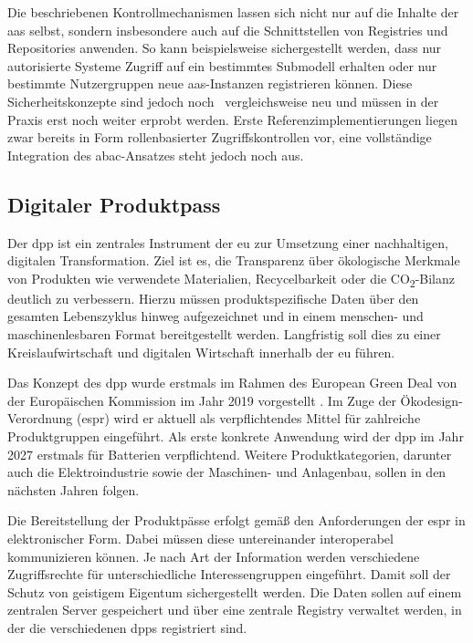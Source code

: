 Die beschriebenen Kontrollmechanismen lassen sich nicht nur auf die Inhalte der \acs{aas} selbst, sondern insbesondere auch auf die Schnittstellen von Registries und Repositories anwenden.
So kann beispielsweise sichergestellt werden, dass nur autorisierte Systeme Zugriff auf ein bestimmtes Submodell erhalten oder nur bestimmte Nutzergruppen neue \acs{aas}-Instanzen registrieren können.
Diese Sicherheitskonzepte sind jedoch noch%
\pagebreak
~vergleichsweise neu und müssen in der Praxis erst noch weiter erprobt werden.
Erste Referenzimplementierungen liegen zwar bereits in Form rollenbasierter Zugriffskontrollen vor, eine vollständige Integration des \acs{abac}-Ansatzes steht jedoch noch aus.


\subsection{Digitaler Produktpass}
Der \acs{dpp} ist ein zentrales Instrument der \acs{eu} zur Umsetzung einer nachhaltigen, digitalen Transformation. 
Ziel ist es, die Transparenz über ökologische Merkmale von Produkten wie verwendete Materialien, Recycelbarkeit oder die CO\textsubscript{2}-Bilanz deutlich zu verbessern.
Hierzu müssen produktspezifische Daten über den gesamten Lebenszyklus hinweg aufgezeichnet und in einem menschen- und maschinenlesbaren Format bereitgestellt werden. \cite{DPPEinführung}
Langfristig soll dies zu einer Kreislaufwirtschaft und digitalen Wirtschaft innerhalb der \acs{eu} führen.

Das Konzept des \acs{dpp} wurde erstmals im Rahmen des European Green Deal von der Europäischen Kommission im Jahr 2019 vorgestellt \cite{GreenDeal}.
Im Zuge der Ökodesign-Verordnung (\ac{espr}) \cite{ESPR} wird er aktuell als verpflichtendes Mittel für zahlreiche Produktgruppen eingeführt.
Als erste konkrete Anwendung wird der \acs{dpp} im Jahr 2027 erstmals für Batterien verpflichtend.
Weitere Produktkategorien, darunter auch die Elektroindustrie sowie der Maschinen- und Anlagenbau, sollen in den nächsten Jahren folgen.

Die Bereitstellung der Produktpässe erfolgt gemäß den Anforderungen der \acs{espr} in elektronischer Form. 
Dabei müssen diese untereinander interoperabel kommunizieren können.
Je nach Art der Information werden verschiedene Zugriffsrechte für unterschiedliche Interessengruppen eingeführt. 
Damit soll der Schutz von geistigem Eigentum sichergestellt werden.
Die Daten sollen auf einem zentralen Server gespeichert und über eine zentrale Registry verwaltet werden, in der die verschiedenen \acsp{dpp} registriert sind.
\cite{CIRPASS}

